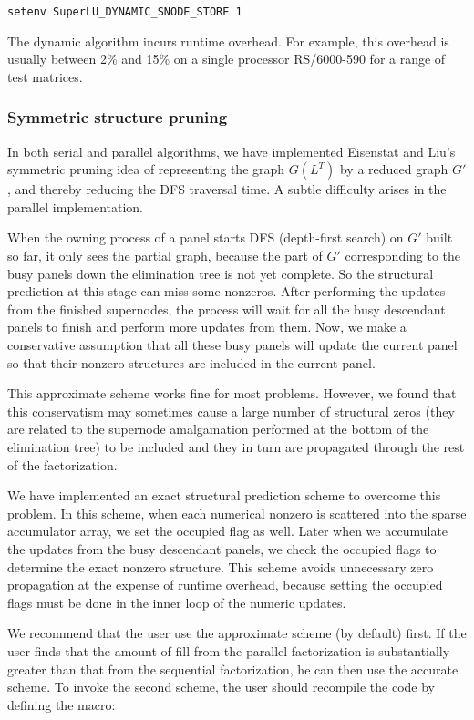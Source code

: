\vspace{.1in}
{\tt setenv SuperLU\_DYNAMIC\_SNODE\_STORE 1}
\vspace{.1in}

\noindent 
The dynamic algorithm incurs runtime overhead. For example, this overhead 
is usually between 2\% and 15\% on a single processor RS/6000-590 for a 
range of test matrices.
 
\subsubsection{Symmetric structure pruning}
In both serial and parallel algorithms, we have implemented Eisenstat
and Liu's symmetric pruning idea of representing the graph $G(L^T)$
by a reduced graph $G'$, and thereby reducing the DFS traversal time.
A subtle difficulty arises in the parallel implementation.

When the owning process of a panel starts DFS (depth-first search) on 
$G'$ built so far, it only sees the partial graph, because the part of $G'$
corresponding to the busy panels down the elimination tree is not yet complete.
So the structural prediction at this stage can miss some nonzeros.
After performing the updates from the finished supernodes, the process 
will wait for all the busy descendant panels to finish
and perform more updates from them. Now, we make a conservative
assumption that all these busy panels will update the current
panel so that their nonzero structures are included in the current panel.

This approximate scheme works fine for most problems. 
However, we found that this conservatism may sometimes cause 
a large number of structural zeros
(they are related to the supernode amalgamation performed at the
bottom of the elimination tree)
to be included and they in turn are propagated through the rest of the 
factorization.

We have implemented an exact structural prediction scheme to 
overcome this problem.
In this scheme, when each numerical nonzero is scattered into the
sparse accumulator array, we set the occupied flag as well. Later when
we accumulate the updates from the busy descendant panels,
we check the occupied flags to determine the exact nonzero structure.
This scheme avoids unnecessary zero propagation at the expense
of runtime overhead, because setting the occupied flags must be done in
the inner loop of the numeric updates.

We recommend that the user use the approximate scheme
(by default) first. If the user finds
that the amount of fill from the parallel factorization is 
substantially greater than that from the sequential factorization,
he can then use the accurate scheme.
To invoke the second scheme, the user should recompile the code by 
defining the macro:
 
